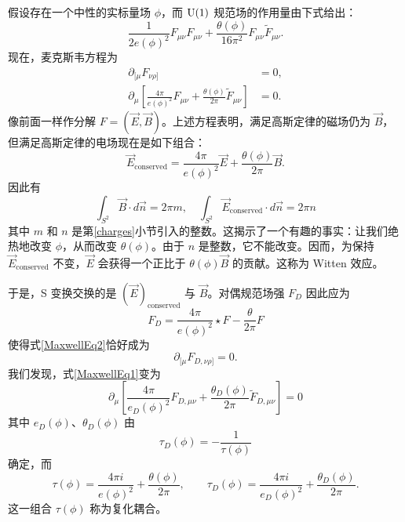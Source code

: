 假设存在一个中性的实标量场 $\phi$，而 ${\mathrm{U}}(1)$ 规范场的作用量由下式给出：
\begin{equation}
\frac{1}{2e(\phi)^2} F_{\mu\nu}F_{\mu\nu} + \frac{\theta(\phi)}{16\pi^2} F_{\mu\nu} \tilde F_{\mu\nu}.
\label{u1coupling}
\end{equation}
现在，麦克斯韦方程为
\begin{align}
\partial_{[\mu}F_{\nu\rho]}&=0,\label{MaxwellEq1}\\
\partial_{\mu}\left[ \frac{4\pi}{e(\phi)^2} F_{\mu\nu}+\frac{\theta(\phi)}{2\pi}\tilde F_{\mu\nu}\right]&=0.
\label{MaxwellEq2}
\end{align}
像前面一样作分解 $F=(\vec E,\vec B)$。上述方程表明，满足高斯定律的磁场仍为 $\vec B$，但满足高斯定律的电场现在是如下组合：
\begin{equation}
\vec E_\text{conserved} = \frac{4\pi }{e(\phi)^2} \vec E+\frac{\theta(\phi)}{2\pi} \vec B.
\end{equation}
因此有
\begin{equation}
\int_{S^2} \vec B \cdot d\vec n= 2\pi m,\quad
\int_{S^2} \vec E_\text{conserved} \cdot d\vec n = 2\pi n
\end{equation}
其中 $m$ 和 $n$ 是第\ref{charges}小节引入的整数。这揭示了一个有趣的事实：让我们绝热地改变 $\phi$，从而改变 $\theta(\phi)$。由于 $n$ 是整数，它不能改变。因而，为保持 $\vec E_\text{conserved}$ 不变，$\vec E$ 会获得一个正比于 $\theta(\phi)\vec B$ 的贡献。这称为 Witten 效应\cite{Witten:1979ey}。

于是，S 变换交换的是 $(\vec E)_\text{conserved}$ 与 $\vec B$。对偶规范场强 $F_D$ 因此应为
\begin{equation}
F_D=\frac{4\pi}{e(\phi)^2} {}\star F - \frac{\theta}{2\pi}F
\end{equation}
使得式\eqref{MaxwellEq2}恰好成为
\begin{equation}
\partial_{[\mu}F_{D,\nu\rho]}=0.
\end{equation}
我们发现，式\eqref{MaxwellEq1}变为
\begin{equation}
\partial_{\mu}\left[ \frac{4\pi}{e_D(\phi)^2} F_{D,\mu\nu}+\frac{\theta_D(\phi)}{2\pi}\tilde F_{D,\mu\nu}\right]=0
\end{equation}
其中 $e_D(\phi)$、$\theta_D(\phi)$ 由
\begin{equation}
\tau_D(\phi)  = -\frac{1}{\tau(\phi)}
\end{equation}
确定，而
\begin{equation}
\tau(\phi)= \frac{4\pi i}{e(\phi)^2} + \frac{\theta(\phi)}{2\pi},\qquad
\tau_D(\phi)= \frac{4\pi i}{e_D(\phi)^2} + \frac{\theta_D(\phi)}{2\pi}.\label{u1tau}
\end{equation}
这一组合 $\tau(\phi)$ 称为复化耦合。

